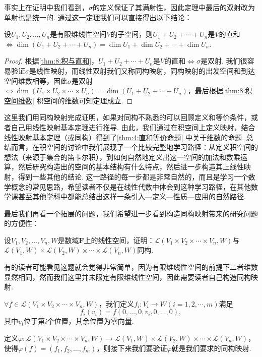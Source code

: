 事实上在证明中我们看到，$\sigma$的定义保证了其满射性，因此定理中最后的双射改为单射也是统一的. 通过这一定理我们可以直接得出以下结论：
\begin{theorem}
    设$U_1,U_2,\ldots,U_n$是有限维线性空间$V$的子空间，则$U_1+U_2+\cdots+U_n$是$V$的直和$\iff \dim(U_1+U_2+\cdots+U_n)=\dim U_1+\dim U_2+\cdots+\dim U_n$.
\end{theorem}

\begin{proof}
    根据\autoref{thm:8:积与直和}，$U_1+U_2+\cdots+U_n$是$V$的直和$\iff \sigma$是双射. 我们很容易验证$\sigma$是线性映射，而线性双射我们又称同构映射，同构映射的出发空间和到达空间维数相等，因此$\sigma$是双射$\iff \dim(U_1 \times U_2 \times \cdots \times U_n)=\dim(U_1+U_2+\cdots+U_n)$，最后根据\autoref{thm:8:积空间维数} 积空间的维数可知定理成立.
\end{proof}

这里我们用同构映射完成证明，如果对同构不熟悉的可以回顾定义和等价条件，或者自己用线性映射基本定理进行推导. 由此，我们通过在积空间上定义映射，结合\hyperref[thm:6:线性映射基本定理]{线性映射基本定理}（或同构）得到了\autoref{thm:4:直和等价命题} 中关于维数的命题. 总结而言，在积空间的讨论中我们展现了一个比较完整地学习路径：从定义积空间的想法（来源于集合的笛卡尔积），到如何自然地定义出这一空间的加法和数乘运算，然后研究构造出的空间的基本结构有什么特点，然后进一步构造其上线性映射，得到一些其他的结论. 这一路径的每一步都是非常自然的，而且是学习一个数学概念的常见思路，希望读者不仅是在线性代数中体会到这种学习路径，在其他数学课甚至其他学科中都能总结出这样一条引入—定义—性质—应用的自然路径.

最后我们再看一个拓展的问题，我们希望进一步看到构造同构映射带来的研究问题的方便性：
\begin{example}
    设$V_1,V_2,\ldots,V_n,W$是数域$\mathbf{F}$上的线性空间，证明：$\mathcal{L}(V_1 \times V_2 \times \cdots \times V_n,W)$与$\mathcal{L}(V_1,W) \times \mathcal{L}(V_2,W) \times \cdots \times \mathcal{L}(V_n,W)$同构.
\end{example}
有的读者可能看见这题就会觉得非常简单，因为有限维线性空间的前提下二者维数显然相同，然而我们这里并未限定有限维线性空间，因此需要读者自己构造同构映射.

\begin{solution}
    $\forall f\in \mathcal{L}(V_1 \times V_2 \times \cdots \times V_n,W)$，我们定义$f_i:V_i\to W(i=1,2,\cdots,m)$满足
    \[f_i(v_i)=f(0,\ldots,0,v_i,0,\ldots,0),\]
    其中$v_i$位于第$i$个位置，其余位置为零向量.

    定义$\varphi:\mathcal{L}(V_1 \times V_2 \times \cdots \times V_n,W)\to \mathcal{L}(V_1,W) \times \mathcal{L}(V_2,W) \times \cdots \times \mathcal{L}(V_n,W)$，使得$\varphi(f)=(f_1,f_2,\ldots,f_m)$，则接下来我们要验证$\varphi$就是我们要求的同构映射.
\end{solution}

